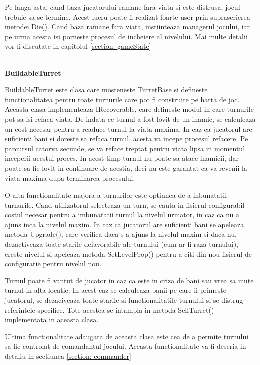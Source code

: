 \documentclass[12pt, a4paper]{article}
\begin{document}
	Pe langa asta, cand baza jucatorului ramane fara viata si este distrusa, jocul trebuie sa se termine. Acest lucru poate fi realizat foarte usor prin suprascrierea metodei Die(). Cand baza ramane fara viata, instiinteaza managerul jocului, iar pe urma acesta isi porneste procesul de incheiere al nivelului. Mai multe detalii vor fi discutate in capitolul \ref{section: gameState}
	
	\ \\
	\textbf{BuildableTurret}
	
	BuildableTurret este clasa care mosteneste TurretBase si defineste functionalitatea pentru toate turnurile care pot fi construite pe harta de joc. Aceasta clasa implementeaza IRecoverable, care defineste modul in care turnurile pot sa isi refaca viata. De indata ce turnul a fost lovit de un inamic, se calculeaza un cost necesar pentru a readuce turnul la viata maxima. In caz ca jucatorul are suficienti bani si doreste sa refaca turnul, acesta va incepe procesul refacere. Pe parcursul catorva secunde, se va reface treptat pentru viata lipsa in momentul inceperii acestui proces. In acest timp turnul nu poate sa atace inamicii, dar poate sa fie lovit in continuare de acestia, deci nu este garantat ca va revenii la viata maxima dupa terminarea procesului.
	\newline
	
	O alta functionalitate majora a turnurilor este optiunea de a inbunatatii turnurile. Cand utilizatorul selecteaza un turn, se cauta in fisierul configurabil costul necesar pentru a imbunatatii turnul la nivelul urmator, in caz ca nu a ajuns inca la nivelul maxim. In caz ca jucatorul are suficienti bani se apeleaza metoda Upgrade(), care verifica daca s-a ajuns la nivelul maxim si daca nu, dezactiveaza toate starile defavorabile ale turnului (cum ar fi raza turnului), creste nivelul si apeleaza metoda SetLevelProp() pentru a citi din nou fisierul de configuratie pentru nivelul nou.
	\newline
	
	Turnul poate fi vantut de jucator in caz ca este in criza de bani sau vrea sa mute turnul in alta locatie. In acest caz se calculeaza banii pe care ii primeste jucatorul, se dezaciveaza toate starile si functionalitatile turnului si se distrug referintele specifice. Tote acestea se intampla in metoda SellTurret() implementata in aceasta clasa.
	\newline
	
	Ultima functionalitate adaugata de aceasta clasa este cea de a permite turnului sa fie controlat de comandantul jocului. Aceasta functionalitate va fi descria in detaliu in sectiunea \ref{section: commander} 
	
\end{document}
